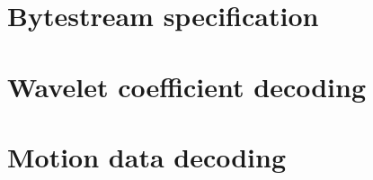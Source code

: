 

\section{Bytestream specification}

\clearpage
\section{Wavelet coefficient decoding}

\clearpage
\section{Motion data decoding}
